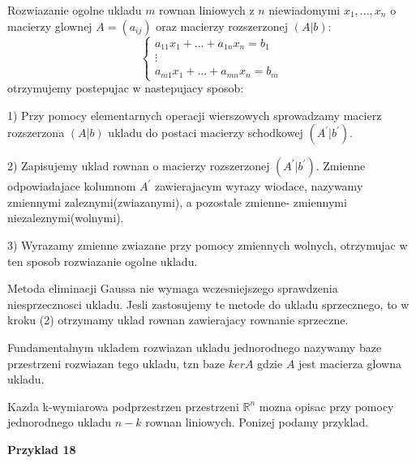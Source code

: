 \documentclass{article}
\begin{document}
\begin{tcolorbox}[colback=white!90!green,colframe=black!35!green,title=Metoda eliminacji Gaussa]

Rozwiazanie ogolne ukladu $m$ rownan liniowych z $n$ niewiadomymi $x_{1},...,x_{n}$ o macierzy glownej $A = (a_{ij})$ oraz macierzy rozszerzonej $(A|b)$:
$$ \begin{cases}
a_{11}x_{1} + ... + a_{1n}x_{n} = b_{1} \\
\vdots \\
a_{m1}x_{1} + ... + a_{mn}x_{n} = b_{m}
\end{cases} $$
otrzymujemy postepujac w nastepujacy sposob:

1) Przy pomocy elementarnych operacji wierszowych sprowadzamy macierz rozszerzona $(A|b)$ ukladu do postaci macierzy schodkowej $(A^{\prime}|b^{\prime})$.

2) Zapisujemy uklad rownan o macierzy rozszerzonej $(A^{\prime}|b^{\prime})$. Zmienne odpowiadajace kolumnom $A^{\prime}$ zawierajacym wyrazy wiodace, nazywamy zmiennymi zaleznymi(zwiazanymi), a pozostale zmienne- zmiennymi niezaleznymi(wolnymi).

3) Wyrazamy zmienne zwiazane przy pomocy zmiennych wolnych, otrzymujac w ten sposob rozwiazanie ogolne ukladu.

\end{tcolorbox}

Metoda eliminacji Gaussa nie wymaga wczesniejszego sprawdzenia niesprzecznosci ukladu. Jesli zastosujemy te metode do ukladu sprzecznego, to w kroku (2) otrzymamy uklad rownan zawierajacy rownanie sprzeczne. 

\begin{tcolorbox}[colback=white!90!red,colframe=black!35!red,title=Definicja 2.53 Fundamentalny uklad rozwiazan]
Fundamentalnym ukladem rozwiazan ukladu jednorodnego nazywamy baze przestrzeni rozwiazan tego ukladu, tzn baze $kerA$ gdzie $A$ jest macierza glowna ukladu.
\end{tcolorbox}
\begin{tcolorbox}[colback=white!90!green,colframe=black!35!green,title=Fakt 2.54 Charakteryzacja podprzestrzeni]

Kazda k-wymiarowa podprzestrzen przestrzeni $\mathbb{R}^{n}$ mozna opisac przy pomocy jednorodnego ukladu $n-k$ rownan liniowych. Ponizej podamy przyklad.
\end{tcolorbox}

\textbf{Przyklad 18}
\end{document}
